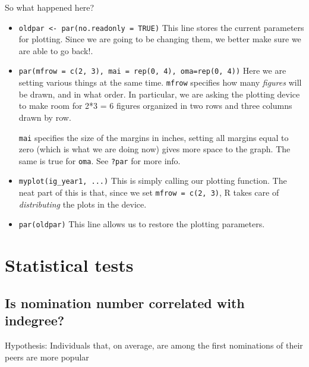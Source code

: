 \documentclass[]{book}
\begin{document}
So what happened here?

\begin{itemize}
\item
  \texttt{oldpar\ \textless{}-\ par(no.readonly\ =\ TRUE)} This line stores the current parameters for plotting. Since we are going to be changing them, we better make sure we are able to go back!.
\item
  \texttt{par(mfrow\ =\ c(2,\ 3),\ mai\ =\ rep(0,\ 4),\ oma=rep(0,\ 4))} Here we are setting various things at the same time. \texttt{mfrow} specifies how many \emph{figures} will be drawn, and in what order. In particular, we are asking the plotting device to make room for 2*3 = 6 figures organized in two rows and three columns drawn by row.

  \texttt{mai} specifies the size of the margins in inches, setting all margins equal to zero (which is what we are doing now) gives more space to the graph. The same is true for \texttt{oma}. See \texttt{?par} for more info.
\item
  \texttt{myplot(ig\_year1,\ ...)} This is simply calling our plotting function. The neat part of this is that, since we set \texttt{mfrow\ =\ c(2,\ 3)}, R takes care of \emph{distributing} the plots in the device.
\item
  \texttt{par(oldpar)} This line allows us to restore the plotting parameters.
\end{itemize}

\hypertarget{statistical-tests}{%
\section{Statistical tests}\label{statistical-tests}}

\hypertarget{is-nomination-number-correlated-with-indegree}{%
\subsection{Is nomination number correlated with indegree?}\label{is-nomination-number-correlated-with-indegree}}

Hypothesis: Individuals that, on average, are among the first nominations of their peers are more popular
\end{document}
